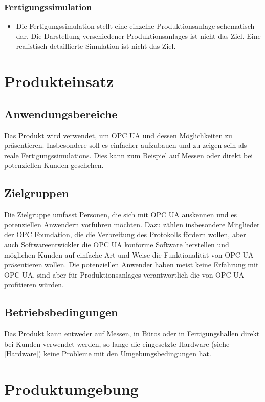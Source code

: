 \documentclass[parskip=full]{scrartcl}
\begin{document}
\subsubsection{Fertigungssimulation}
\begin{itemize}
  \item Die \gls{Fertigungssimulation} stellt eine einzelne \gls{Produktionsanlage} schematisch dar. Die Darstellung verschiedener \glspl{Produktionsanlage}
    ist nicht das Ziel. Eine realistisch-detaillierte Simulation ist nicht das Ziel.
\end{itemize}



\newpage
\section{Produkteinsatz}
\subsection{Anwendungsbereiche}
Das Produkt wird verwendet, um \gls{OPC UA} und dessen Möglichkeiten zu präsentieren.
Insbesondere soll es einfacher aufzubauen und zu zeigen sein als reale \glspl{Fertigungssimulation}.
Dies kann zum Beispiel auf Messen oder direkt bei potenziellen Kunden geschehen.
\subsection{Zielgruppen}
Die Zielgruppe umfasst Personen, die sich mit OPC UA auskennen und es potenziellen Anwendern vorführen möchten.
Dazu zählen insbesondere Mitglieder der OPC Foundation, die die Verbreitung des Protokolls fördern wollen,
aber auch Softwareentwickler die OPC UA konforme Software herstellen und möglichen Kunden auf einfache Art und
Weise die Funktionalität von OPC UA präsentieren wollen.
Die potenziellen Anwender haben meist keine Erfahrung mit OPC UA, sind aber für \glspl{Produktionsanlage} verantwortlich
die von OPC UA profitieren würden.

\subsection{Betriebsbedingungen}
Das Produkt kann entweder auf Messen, in Büros oder in Fertigungshallen direkt bei Kunden verwendet werden,
so lange die eingesetzte Hardware (siehe \ref{Hardware}) keine Probleme mit den Umgebungsbedingungen hat.

\pagebreak
\section{Produktumgebung}
\end{document}
